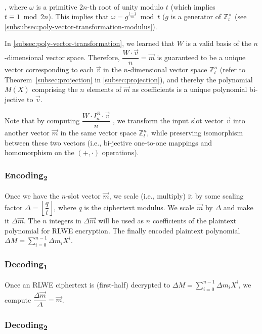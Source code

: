 $ $

, where $\omega$ is a primitive $2n$-th root of unity modulo $t$ (which implies $t \equiv 1 \bmod 2n$). This implies that $\omega = g^{\frac{t - 1}{2n}} \bmod t$ ($g$ is a generator of $\mathbb{Z}_t^{\times}$ (see \autoref{subsubsec:poly-vector-transformation-modulus}).

In \autoref{subsec:poly-vector-transformation}, we learned that $W$ is a valid basis of the $n$-dimensional vector space. Therefore, $\dfrac{W \cdot \vec{v}}{n} = \vec{m}$ is guaranteed to be a unique vector corresponding to each $\vec{v}$ in the $n$-dimensional vector space $\mathbb{Z}_t^{n}$ (refer to Theorem~\ref*{subsec:projection} in \autoref{subsec:projection}), and thereby the polynomial $M(X)$ comprising the $n$ elements of $\vec{m}$ as coefficients is a unique polynomial bi-jective to $\vec{v}$. 

Note that by computing $\dfrac{W \cdot I_n^R \cdot \vec{v}}{n}$
, we transform the input slot vector $\vec{v}$ into another vector $\vec{m}$ in the same vector space $\mathbb{Z}_t^{n}$, while preserving isomorphism between these two vectors (i.e., bi-jective one-to-one mappings and homomorphism on the $(+, \cdot)$ operations). 

\subsubsection{\textsf{Encoding\textsubscript{2}}}  

Once we have the $n$-slot vector $\vec{m}$, we scale (i.e., multiply) it by some scaling factor $\Delta = \left\lfloor \dfrac{q}{t} \right\rfloor$, where $q$ is the ciphertext modulus. We scale $\vec{m}$ by $\Delta$ and make it $\Delta \vec{m}$. 
The $n$ integers in $\Delta\vec{m}$ will be used as $n$ coefficients of the plaintext polynomial for RLWE encryption. The finally encoded plaintext polynomial $\Delta M = \sum\limits_{i=0}^{n-1}\Delta m_iX^i$. 


\subsubsection{\textsf{Decoding\textsubscript{1}}}  
\label{subsubsec:bfv-enc-dec-decoding1} 

Once an RLWE ciphertext is (first-half) decrypted to $\Delta M = \sum\limits_{i=0}^{n-1}\Delta m_iX^i$, we compute $\dfrac{\Delta\vec{m}}{\Delta} = \vec{m}$.




\subsubsection{\textsf{Decoding\textsubscript{2}}}  


